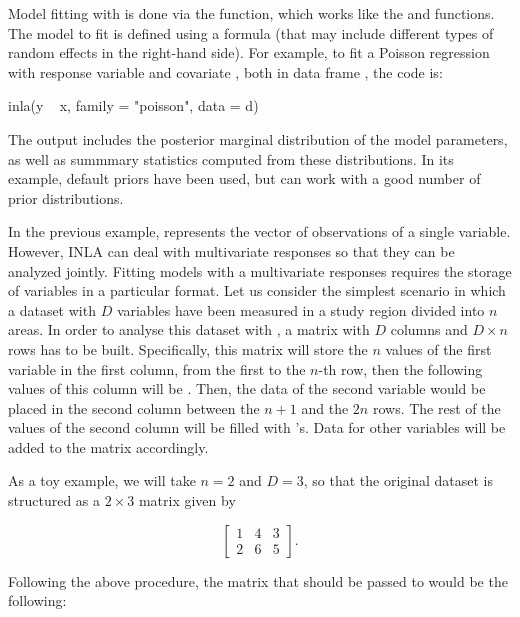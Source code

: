 \medskip
Model fitting with  is done via the  function, which works like the  and  functions. The model to fit is defined using a formula (that may include different types of random effects in the right-hand side). For example, to fit a Poisson regression with response variable  and covariate , both in data frame , the code is:


\medskip
\begin{example*}

inla(y ~ x, family = "poisson", data = d)

\end{example*}

\medskip
The output includes the posterior marginal distribution of the model parameters, as well as summmary statistics computed from these distributions. In its example, default priors have been used, but  can work with a good number of prior distributions.

\medskip
In the previous example,  represents the vector of observations of a single variable. However, INLA can deal with multivariate responses so that they can be analyzed jointly. Fitting models with a multivariate responses requires the storage of variables in a particular format. Let us consider the simplest scenario in which 
a dataset with $D$ variables have been measured in a study region divided into $n$ areas. In order to analyse this dataset with , a matrix with $D$ columns and $D \times n$ rows has to be built. Specifically, this matrix will store the $n$ values of the first variable in the first column, from the first to the $n$-th row, then the following values of this column will be .
Then, the data of the second variable would be placed in the second column between the $n+1$ and the $2n$ rows. The rest of the values of the second column will be filled with 's. Data for other variables will be added to the matrix accordingly.

\medskip
As a toy example, we will take $n=2$ and $D=3$, so that the original dataset is structured as a $2\times 3$ matrix given by


$$
\begin{bmatrix}
1 & 4 & 3 \\
2 & 6 & 5 
\end{bmatrix} .
$$



Following the above procedure, the matrix that should be passed to  would be the following:


